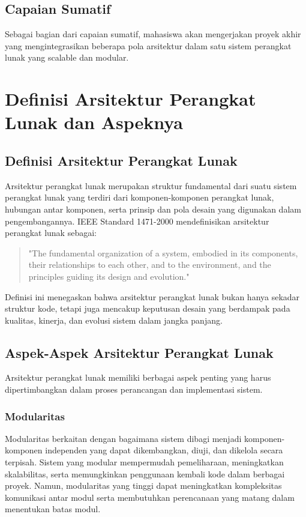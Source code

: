 \begin{enumerate}
\end{enumerate}

\subsection{Capaian Sumatif}

Sebagai bagian dari capaian sumatif, mahasiswa akan mengerjakan proyek akhir yang mengintegrasikan beberapa pola arsitektur dalam satu sistem perangkat lunak yang scalable dan modular.


\section{Definisi Arsitektur Perangkat Lunak dan Aspeknya}

\subsection{Definisi Arsitektur Perangkat Lunak}

Arsitektur perangkat lunak merupakan struktur fundamental dari suatu sistem perangkat lunak yang terdiri dari komponen-komponen perangkat lunak, hubungan antar komponen, serta prinsip dan pola desain yang digunakan dalam pengembangannya. IEEE Standard 1471-2000 mendefinisikan arsitektur perangkat lunak sebagai:

\begin{quote}
"The fundamental organization of a system, embodied in its components, their relationships to each other, and to the environment, and the principles guiding its design and evolution."
\end{quote}

Definisi ini menegaskan bahwa arsitektur perangkat lunak bukan hanya sekadar struktur kode, tetapi juga mencakup keputusan desain yang berdampak pada kualitas, kinerja, dan evolusi sistem dalam jangka panjang.

\subsection{Aspek-Aspek Arsitektur Perangkat Lunak}

Arsitektur perangkat lunak memiliki berbagai aspek penting yang harus dipertimbangkan dalam proses perancangan dan implementasi sistem.

\subsubsection{Modularitas}
Modularitas berkaitan dengan bagaimana sistem dibagi menjadi komponen-komponen independen yang dapat dikembangkan, diuji, dan dikelola secara terpisah. Sistem yang modular mempermudah pemeliharaan, meningkatkan skalabilitas, serta memungkinkan penggunaan kembali kode dalam berbagai proyek. Namun, modularitas yang tinggi dapat meningkatkan kompleksitas komunikasi antar modul serta membutuhkan perencanaan yang matang dalam menentukan batas modul.

